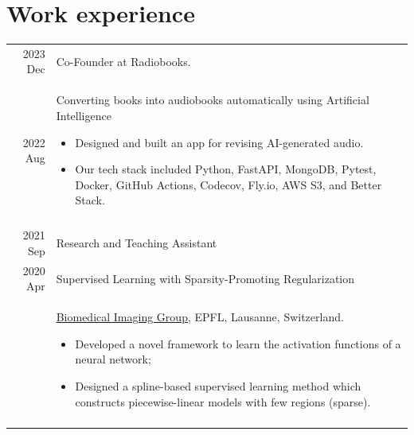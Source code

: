 \documentclass[a4paper,11pt]{article}
\begin{document}

  \newpage

  \section{Work experience}

    \begin{tabular}{r|p{13cm}}

      2023 Dec 	& Co-Founder at Radiobooks. \\
      2022 Aug 	& Converting books into audiobooks automatically using Artificial Intelligence
      \begin{itemize}[leftmargin=*,noitemsep]
          \item \footnotesize{Designed and built an app for revising AI-generated audio.}
          \item \footnotesize{Our tech stack included Python, FastAPI, MongoDB, Pytest, Docker, GitHub Actions, Codecov, Fly.io, AWS S3, and Better Stack.}
      \end{itemize} \vspace*{-\baselineskip}\\
      \multicolumn{2}{c}{} \\


      2021 Sep 	& Research and Teaching Assistant \\
      2020 Apr 	& Supervised Learning with Sparsity-Promoting Regularization \\
				& \footnotesize{\href{https://bigwww.epfl.ch/}{Biomedical Imaging Group}, EPFL, Lausanne, Switzerland.
				  }
        \begin{itemize}[leftmargin=*,noitemsep]
          \item \footnotesize{Developed a novel framework to learn the activation functions of a neural network;}
          \item \footnotesize{Designed a spline-based supervised learning method which constructs piecewise-linear models with few regions (sparse).}
        \end{itemize} \vspace*{-\baselineskip}\\
      \multicolumn{2}{c}{} \\


\end{tabular}
\end{document}
